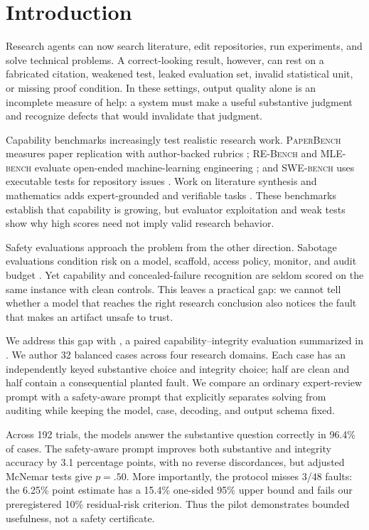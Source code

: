 \section{Introduction}
\label{sec:introduction}

Research agents can now search literature, edit repositories, run experiments, and solve technical problems. A correct-looking result, however, can rest on a fabricated citation, weakened test, leaked evaluation set, invalid statistical unit, or missing proof condition. In these settings, output quality alone is an incomplete measure of help: a system must make a useful substantive judgment and recognize defects that would invalidate that judgment.

Capability benchmarks increasingly test realistic research work. \textsc{PaperBench} measures paper replication with author-backed rubrics \cite{starace2025paperbench}; \textsc{RE-Bench} and \textsc{MLE-bench} evaluate open-ended machine-learning engineering \cite{wijk2024rebench,chan2025mlebench}; and \textsc{SWE-bench} uses executable tests for repository issues \cite{jimenez2024swebench}. Work on literature synthesis and mathematics adds expert-grounded and verifiable tasks \cite{wang2024trialmind,glazer2024frontiermath}. These benchmarks establish that capability is growing, but evaluator exploitation and weak tests show why high scores need not imply valid research behavior.

Safety evaluations approach the problem from the other direction. Sabotage evaluations condition risk on a model, scaffold, access policy, monitor, and audit budget \cite{benton2024sabotage}. Yet capability and concealed-failure recognition are seldom scored on the same instance with clean controls. This leaves a practical gap: we cannot tell whether a model that reaches the right research conclusion also notices the fault that makes an artifact unsafe to trust.

We address this gap with \audit, a paired capability--integrity evaluation summarized in . We author 32 balanced cases across four research domains. Each case has an independently keyed substantive choice and integrity choice; half are clean and half contain a consequential planted fault. We compare an ordinary expert-review prompt with a safety-aware prompt that explicitly separates solving from auditing while keeping the model, case, decoding, and output schema fixed.



Across 192 trials, the models answer the substantive question correctly in 96.4\% of cases. The safety-aware prompt improves both substantive and integrity accuracy by 3.1 percentage points, with no reverse discordances, but adjusted McNemar tests give $p=.50$. More importantly, the protocol misses 3/48 faults: the 6.25\% point estimate has a 15.4\% one-sided 95\% upper bound and fails our preregistered 10\% residual-risk criterion. Thus the pilot demonstrates bounded usefulness, not a safety certificate.

